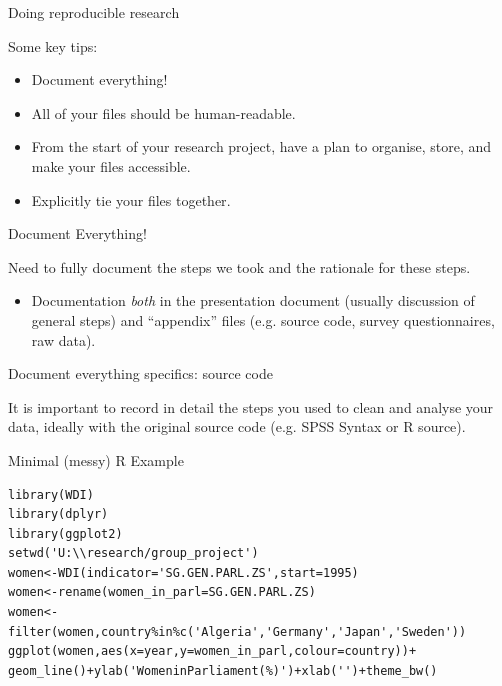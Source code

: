 \documentclass[10pt]{beamer}
\begin{document}
\begin{frame}{Doing reproducible research}

    {\large{Some key tips:}}

    \begin{itemize}

        \item \alert{Document everything!}

        \item All of your files should be \alert{human-readable}.

        \item \alert{From the start} of your research project, have a plan to \alert{organise}, store, and make your files accessible.

        \item Explicitly \alert{tie your files together}.
    \end{itemize}

\end{frame}


\begin{frame}{Document Everything!}

    Need to \alert{fully document} the steps we took and the rationale for these steps.

    \begin{itemize}
        \item Documentation \emph{both} in the presentation document (usually discussion of general steps) and ``appendix'' files (e.g. source code, survey questionnaires, raw data).
    \end{itemize}

\end{frame}

\begin{frame}{Document everything specifics: source code}

    It is important to record in detail the steps you used to clean and analyse your data, ideally with the original source code (e.g. SPSS Syntax or R source).

\end{frame}

\begin{frame}[fragile]{Minimal (messy) R Example}

\begin{lstlisting}
library(WDI)
library(dplyr)
library(ggplot2)
setwd('U:\\research/group_project')
women<-WDI(indicator='SG.GEN.PARL.ZS',start=1995)
women<-rename(women_in_parl=SG.GEN.PARL.ZS)
women<-filter(women,country%in%c('Algeria','Germany','Japan','Sweden'))
ggplot(women,aes(x=year,y=women_in_parl,colour=country))+
geom_line()+ylab('WomeninParliament(%)')+xlab('')+theme_bw()
\end{lstlisting}

\end{frame}
\end{document}
